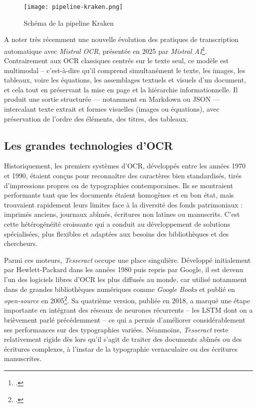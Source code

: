 \begin{figure}[htbp]
\centering
\texttt{[image: pipeline-kraken.png]}
\caption{Schéma de la pipeline Kraken}
\label{fig:pipeline-kraken}
\end{figure}

A noter très récemment une nouvelle évolution des pratiques de transcription automatique avec \emph{Mistral OCR}, présentée en 2025 par \emph{Mistral AI}\footcite[][]{mistralocr}. Contrairement aux OCR classiques centrés sur le texte seul, ce modèle est multimodal -- c'est-à-dire qu'il comprend simultanément le texte, les images, les tableaux, voire les équations, les assemblages textuels et visuels d’un document, et cela tout en préservant la mise en page et la hiérarchie informationnelle. Il produit une sortie structurée — notamment en Markdown ou JSON — intercalant texte extrait et formes visuelles (images ou équations), avec préservation de l’ordre des éléments, des titres, des tableaux.

\subsection{Les grandes technologies d'OCR}

Historiquement, les premiers systèmes d’OCR, développés entre les années 1970 et 1990, étaient conçus pour reconnaître des caractères bien standardisés, tirés d’impressions propres ou de typographies contemporaines. Ils se montraient performants tant que les documents étaient homogènes et en bon état, mais trouvaient rapidement leurs limites face à la diversité des fonds patrimoniaux : imprimés anciens, journaux abîmés, écritures non latines ou manuscrits. C’est cette hétérogénéité croissante qui a conduit au développement de solutions spécialisées, plus flexibles et adaptées aux besoins des bibliothèques et des chercheurs.

Parmi ces moteurs, \emph{Tesseract} occupe une place singulière. Développé initialement par Hewlett-Packard dans les années 1980 puis repris par Google, il est devenu l’un des logiciels libres d’OCR les plus diffusés au monde, car utilisé notamment dans de grandes bibliothèques numériques comme \emph{Google Books} et publié en \emph{open-source} en 2005\footcite[][]{smith}. Sa quatrième version, publiée en 2018, a marqué une étape importante en intégrant des réseaux de neurones récurrents -- les LSTM dont on a brièvement parlé précédemment -- ce qui a permis d’améliorer considérablement ses performances sur des typographies variées. Néanmoins, \emph{Tesseract} reste relativement rigide dès lors qu’il s’agit de traiter des documents abîmés ou des écritures complexes, à l'instar de la typographie vernaculaire ou des écritures manuscrites.

